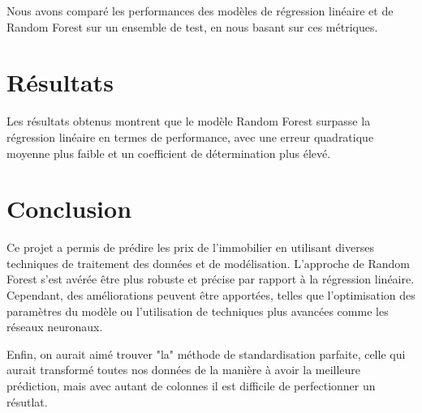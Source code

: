 \documentclass[a4paper,12pt,french]{article}
\begin{document}
Nous avons comparé les performances des modèles de régression linéaire et de Random Forest sur un ensemble de test, en nous basant sur ces métriques.

\section{Résultats}

Les résultats obtenus montrent que le modèle Random Forest surpasse la régression linéaire en termes de performance, avec une erreur quadratique moyenne plus faible et un coefficient de détermination plus élevé.

\section{Conclusion}

Ce projet a permis de prédire les prix de l'immobilier en utilisant diverses techniques de traitement des données et de modélisation. L'approche de Random Forest s'est avérée être plus robuste et précise par rapport à la régression linéaire. Cependant, des améliorations peuvent être apportées, telles que l'optimisation des paramètres du modèle ou l'utilisation de techniques plus avancées comme les réseaux neuronaux.

Enfin, on aurait aimé trouver "la" méthode de standardisation parfaite, celle qui aurait transformé toutes nos données de la manière à avoir la meilleure prédiction, mais avec autant de colonnes il est difficile de perfectionner un résutlat.
\end{document}
